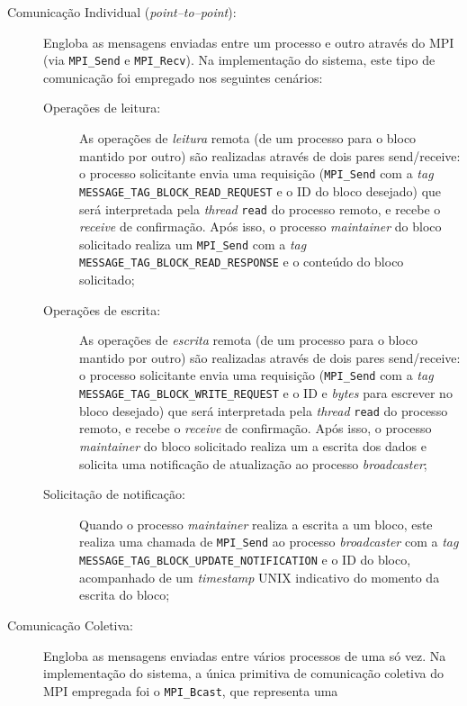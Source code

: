 \documentclass[12pt]{article}
\begin{document}
\begin{description}
  \item[Comunicação Individual (\textit{point--to--point}):] Engloba as mensagens enviadas entre um processo e outro
    através do MPI (via \texttt{MPI\_Send} e \texttt{MPI\_Recv}). Na implementação do sistema, este tipo de comunicação
    foi empregado nos seguintes cenários:
    \begin{description}
      \item[Operações de leitura:] As operações de \textit{leitura} remota (de um processo para o bloco mantido por
        outro) são realizadas através de dois pares send/receive: o processo solicitante envia uma requisição
        (\texttt{MPI\_Send} com a \textit{tag} \texttt{MESSAGE\_TAG\_BLOCK\_READ\_REQUEST} e o ID do bloco desejado) que
        será interpretada pela \textit{thread} \texttt{read} do processo remoto, e recebe o
        \textit{receive} de confirmação. Após isso, o processo \textit{maintainer} do bloco solicitado realiza um
        \texttt{MPI\_Send} com a \textit{tag} \texttt{MESSAGE\_TAG\_BLOCK\_READ\_RESPONSE} e o conteúdo do bloco solicitado;
      \item[Operações de escrita:] As operações de \textit{escrita} remota (de um processo para o bloco mantido por
        outro) são realizadas através de dois pares send/receive: o processo solicitante envia uma requisição
        (\texttt{MPI\_Send} com a \textit{tag} \texttt{MESSAGE\_TAG\_BLOCK\_WRITE\_REQUEST} e o ID e \textit{bytes} para
        escrever no bloco desejado) que será interpretada pela \textit{thread} \texttt{read} do processo remoto, e recebe
        o \textit{receive} de confirmação. Após isso, o processo \textit{maintainer} do bloco solicitado realiza um a 
        escrita dos dados e solicita uma notificação de atualização ao processo \textit{broadcaster};
      \item[Solicitação de notificação:] Quando o processo \textit{maintainer} realiza a escrita a um bloco, este
        realiza uma chamada de \texttt{MPI\_Send} ao processo \textit{broadcaster} com a \textit{tag}
        \texttt{MESSAGE\_TAG\_BLOCK\_UPDATE\_NOTIFICATION} e o ID do bloco, acompanhado de um \textit{timestamp} UNIX
        indicativo do momento da escrita do bloco;
    \end{description}
  \item[Comunicação Coletiva:] Engloba as mensagens enviadas entre vários processos de uma só vez. Na implementação do
    sistema, a única primitiva de comunicação coletiva do MPI empregada foi o \texttt{MPI\_Bcast}, que representa uma

\end{description}
\end{document}
